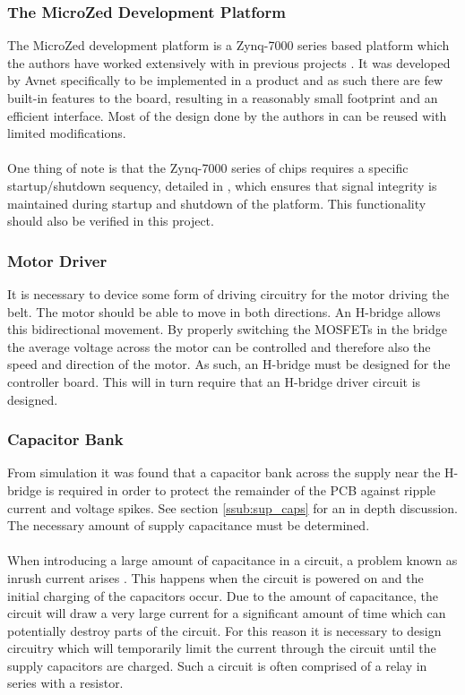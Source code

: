\subsubsection{The MicroZed Development Platform} %
\label{ssub:microcontroller}
The MicroZed \cite{microzed} development platform is a Zynq-7000 series based platform which the authors have worked extensively with in previous projects \cite{isaswarm}.
It was developed by Avnet specifically to be implemented in a product and as such there are few built-in features to the board, resulting in a reasonably small footprint and an efficient interface.
Most of the design done by the authors in \cite{isaswarm} can be reused with limited modifications.
\\~\\
One thing of note is that the Zynq-7000 series of chips requires a specific startup/shutdown sequency, detailed in \cite{carrier_card_design_guide}, which ensures that signal integrity is maintained during startup and shutdown of the platform.
This functionality should also be verified in this project.

\subsubsection{Motor Driver}
It is necessary to device some form of driving circuitry for the motor driving the belt.
The motor should be able to move in both directions. 
An H-bridge allows this bidirectional movement.
By properly switching the MOSFETs in the bridge the average voltage across the motor can be controlled and therefore also the speed and direction of the motor.
As such, an H-bridge must be designed for the controller board. 
This will in turn require that an H-bridge driver circuit is designed.

\subsubsection{Capacitor Bank} %
From simulation it was found that a capacitor bank across the supply near the H-bridge is required in order to protect the remainder of the PCB against ripple current and voltage spikes.
See section \ref{ssub:sup_caps} for an in depth discussion.
The necessary amount of supply capacitance must be determined.
\\~\\
When introducing a large amount of capacitance in a circuit, a problem known as inrush current arises \cite{inrush}.
This happens when the circuit is powered on and the initial charging of the capacitors occur.
Due to the amount of capacitance, the circuit will draw a very large current for a significant amount of time which can potentially destroy parts of the circuit.
For this reason it is necessary to design circuitry which will temporarily limit the current through the circuit until the supply capacitors are charged.
Such a circuit is often comprised of a relay in series with a resistor.

